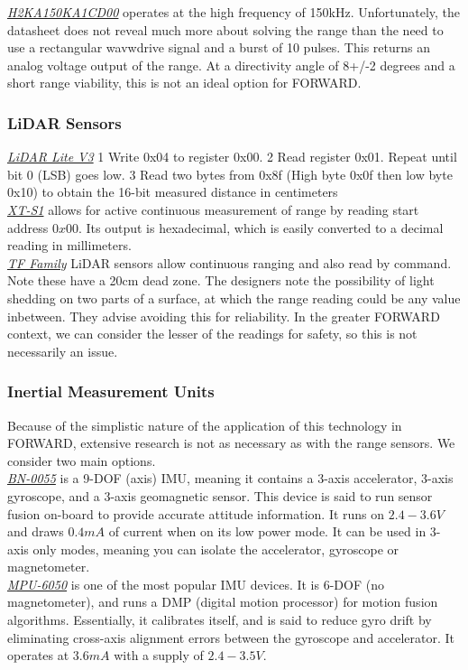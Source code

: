 \noindent \underline{\textit{H2KA150KA1CD00}} operates at the high frequency of 150kHz. Unfortunately, the datasheet does not reveal much more about solving the range than the need to use a rectangular wavwdrive signal and a burst of 10 pulses. This returns an analog voltage output of the range. At a directivity angle of 8+/-2 degrees and a short range viability, this is not an ideal option for FORWARD.\\

\subsubsection{LiDAR Sensors}
\noindent \underline{\textit{LiDAR Lite V3}}
1 Write 0x04 to register 0x00.
2 Read register 0x01. Repeat until bit 0 (LSB) goes low.
3 Read two bytes from 0x8f (High byte 0x0f then low byte 0x10) to obtain the 16-bit measured distance in centimeters \\

\noindent \underline{\textit{XT-S1}} allows for active continuous measurement of range by reading start address $0x00$. Its output is hexadecimal, which is easily converted to a decimal reading in millimeters.\\

\noindent \underline{\textit{TF Family}} LiDAR sensors allow continuous ranging and also read by command. Note these have a 20cm dead zone. The designers note the possibility of light shedding on two parts of a surface, at which the range reading could be any value inbetween. They advise avoiding this for reliability. In the greater FORWARD context, we can consider the lesser of the readings for safety, so this is not necessarily an issue.\\

\subsubsection{Inertial Measurement Units}
\noindent Because of the simplistic nature of the application of this technology in FORWARD, extensive research is not as necessary as with the range sensors. We consider two main options.\\

\noindent \underline{\textit{BN-0055}} is a 9-DOF (axis) IMU, meaning it contains a 3-axis accelerator, 3-axis gyroscope, and a 3-axis geomagnetic sensor. This device is said to run sensor fusion on-board to provide accurate attitude information. It runs on $2.4-3.6V$ and draws $0.4mA$ of current when on its low power mode. It can be used in 3-axis only modes, meaning you can isolate the accelerator, gyroscope or magnetometer.\\

\noindent \underline{\textit{MPU-6050}} is one of the most popular IMU devices. It is 6-DOF (no magnetometer), and runs a DMP (digital motion processor) for motion fusion algorithms. Essentially, it calibrates itself, and is said to reduce gyro drift by eliminating cross-axis alignment errors between the gyroscope and accelerator. It operates at $3.6mA$ with a supply of $2.4-3.5V$.\\